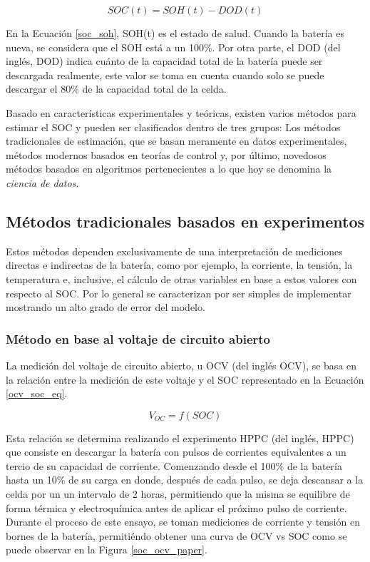 \begin{equation}
    SOC(t) = SOH(t) - DOD(t) \label{soc_soh}
\end{equation}

\noindent En la Ecuaci\'on \ref{soc_soh}, SOH(t) es el estado de salud. 
Cuando la bater\'ia es nueva, se considera que el SOH est\'a a un 100\%. 
Por otra parte, el \acrshort{DOD} (del ingl\'es, \acrlong{DOD}) indica cuánto 
de la capacidad total de la bater\'ia puede ser descargada realmente, este valor 
se toma en cuenta cuando solo se puede descargar el 80\% de la capacidad total 
de la celda.

\noindent Basado en caracter\'isticas experimentales y te\'oricas, existen 
varios m\'etodos para estimar el \acrshort{SOC} y pueden ser clasificados dentro 
de tres grupos: Los m\'etodos tradicionales de estimaci\'on, que se basan 
meramente en datos experimentales, m\'etodos modernos basados en teor\'ias de 
control y, por \'ultimo, novedosos m\'etodos basados en algoritmos
pertenecientes a lo que hoy se denomina la \emph{ciencia de datos}.

\subsection{M\'etodos tradicionales basados en experimentos}
\label{tradSocMeth}

Estos m\'etodos dependen exclusivamente de una interpretaci\'on de mediciones
directas e indirectas de la bater\'ia, como por ejemplo, la corriente, 
la tensi\'on, la temperatura e, inclusive, el c\'alculo de otras variables en
base a estos valores con respecto al \acrshort{SOC}. Por lo general se
caracterizan por ser simples de implementar mostrando un alto grado de error del
modelo. 

\subsubsection{M\'etodo en base al voltaje de circuito abierto}
\label{ocv_section}

\noindent La medici\'on del voltaje de circuito abierto, u \acrshort{OCV} (del
ingl\'es \acrlong{OCV}), se basa en la relaci\'on entre la medici\'on de este 
voltaje y el \acrshort{SOC} representado en la Ecuaci\'on \ref{ocv_soc_eq}.

\begin{equation}
    V_{OC} = f(SOC) \label{ocv_soc_eq}
\end{equation}

\noindent Esta relaci\'on se determina realizando el experimento \acrshort{HPPC} 
(del ingl\'es, \acrlong{HPPC}) que consiste en descargar la bater\'ia con pulsos 
de corrientes equivalentes a un tercio de su capacidad de corriente. Comenzando desde el 
100\% de la bater\'ia hasta un 10\% de su carga en donde, despu\'es de cada 
pulso, se deja descansar a la celda por un un intervalo de 2 horas, permitiendo 
que la misma se equilibre de forma t\'ermica y electroqu\'imica antes de aplicar 
el pr\'oximo pulso de corriente. Durante el proceso de este ensayo, se toman 
mediciones de corriente y tensi\'on en bornes de la bater\'ia, permiti\'endo 
obtener una curva de \acrshort{OCV} vs \acrshort{SOC} como se puede observar en 
la Figura \ref{soc_ocv_paper}.

